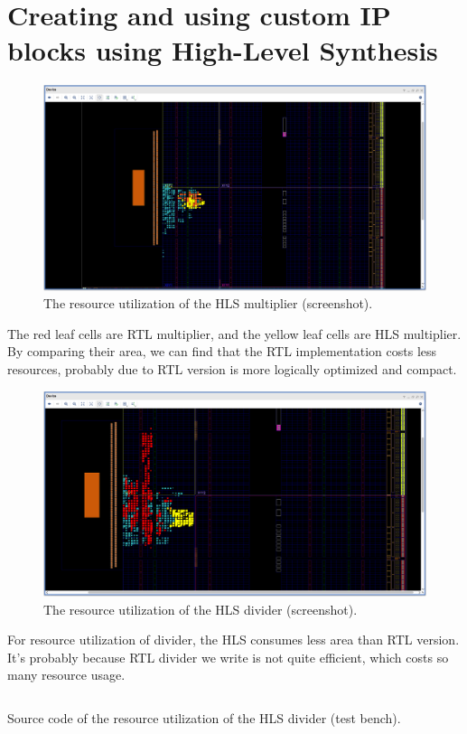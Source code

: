 \documentclass[a4paper]{article}
\begin{document}
\section{Creating and using custom IP blocks using High-Level Synthesis}
\begin{figure}[H]
    \centering
    \includegraphics[width=1\textwidth]{1.png}
    \caption{The resource utilization of the HLS multiplier (screenshot).}
\end{figure}
The red leaf cells are RTL multiplier, and the yellow leaf cells are HLS multiplier. By comparing their area, we can find that the RTL implementation costs less resources, probably due to RTL version is more logically optimized and compact. 
\begin{figure}[H]
    \centering
    \includegraphics[width=1\textwidth]{2.png}
    \caption{The resource utilization of the HLS divider (screenshot).}
\end{figure}
For resource utilization of divider, the HLS consumes less area than RTL version. It's probably because RTL divider we write is not quite efficient, which costs so many resource usage.
\begin{listing}[H]
\inputminted[frame=single,bgcolor=bg,breaklines,linenos]{cpp}{test_hls_divider.cpp}
\caption{Source code of the resource utilization of the HLS divider (test bench).}
\end{listing}
\end{document}
